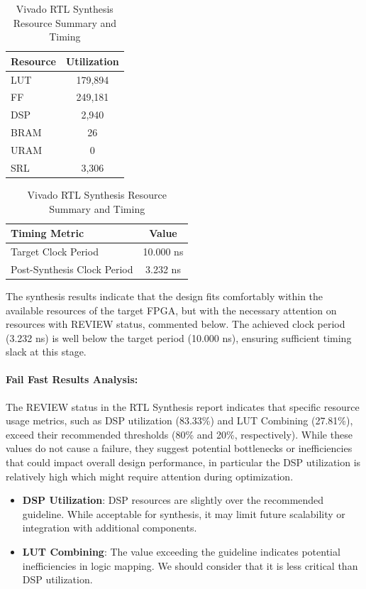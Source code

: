 \documentclass{article}
\begin{document}
\begin{table}[H]
    \centering
    \label{tab:rtl-synthesis-results}
    \begin{tabular}{|l|c|}
        \hline
        \textbf{Resource} & \textbf{Utilization} \\
        \hline
        LUT & 179,894 \\
        FF & 249,181 \\
        DSP & 2,940 \\
        BRAM & 26 \\
        URAM & 0 \\
        SRL & 3,306 \\
        \hline
    \end{tabular}

    \vspace{5mm}

    \begin{tabular}{|l|c|}
        \hline
        \textbf{Timing Metric} & \textbf{Value} \\
        \hline
        Target Clock Period & 10.000 ns \\
        Post-Synthesis Clock Period & 3.232 ns \\
        \hline
    \end{tabular}

    \caption{Vivado RTL Synthesis Resource Summary and Timing}
\end{table}

The synthesis results indicate that the design fits comfortably within the available resources of the target FPGA, but with the necessary attention on resources with REVIEW status, commented below.  The achieved clock period (3.232 ns) is well below the target period (10.000 ns), ensuring sufficient timing slack at this stage.

\paragraph{Fail Fast Results Analysis:}
The REVIEW status in the RTL Synthesis report indicates that specific resource usage metrics, such as DSP utilization (83.33\%) and LUT Combining (27.81\%), exceed their recommended thresholds (80\% and 20\%, respectively). While these values do not cause a failure, they suggest potential bottlenecks or inefficiencies that could impact overall design performance, in particular the DSP utilization is relatively high which might require attention during optimization.
\begin{itemize}
    \item \textbf{DSP Utilization}: DSP resources are slightly over the recommended guideline. While acceptable for synthesis, it may limit future scalability or integration with additional components.
    \item \textbf{LUT Combining}: The value exceeding the guideline indicates potential inefficiencies in logic mapping. We should consider that it is less critical than DSP utilization.
\end{itemize}
\end{document}
